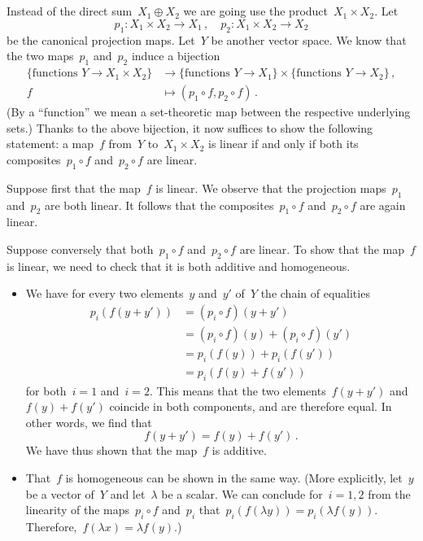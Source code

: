 \subsection{}

Instead of the direct sum~$X_1 ⊕ X_2$ we are going use the product~$X_1 × X_2$.
Let
\[
	p_1 \colon X_1 × X_2 \to X_1 \,,
	\quad
	p_2 \colon X_1 × X_2 \to X_2
\]
be the canonical projection maps.
Let~$Y$ be another vector space.
We know that the two maps~$p_1$ and~$p_2$ induce a bijection
\begin{align*}
	\{ \text{functions~$\textstyle Y \to X_1 × X_2$} \}
	&\to
	\{ \text{functions~$\textstyle Y \to X_1$} \}
	×
	\{ \text{functions~$\textstyle Y \to X_2$} \} \,,
	\\
	f
	&\mapsto
	(p_1 ∘ f, p_2 ∘ f) \,.
\end{align*}
(By a \enquote{function} we mean a set-theoretic map between the respective underlying sets.)
Thanks to the above bijection, it now suffices to show the following statement:
a map~$f$ from~$Y$ to~$X_1 × X_2$ is linear if and only if both its composites~$p_1 ∘ f$ and~$p_2 ∘ f$ are linear.

Suppose first that the map~$f$ is linear.
We observe that the projection maps~$p_1$ and~$p_2$ are both linear.
It follows that the composites~$p_1 ∘ f$ and~$p_2 ∘ f$ are again linear.

Suppose conversely that both~$p_1 ∘ f$ and~$p_2 ∘ f$ are linear.
To show that the map~$f$ is linear, we need to check that it is both additive and homogeneous.
\begin{itemize}

	\item
		We have for every two elements~$y$ and~$y'$ of~$Y$ the chain of equalities
		\begin{align*}
			p_i(f(y + y'))
			&=
			(p_i ∘ f)(y + y')
			\\
			&=
			(p_i ∘ f)(y) + (p_i ∘ f)(y')
			\\
			&=
			p_i(f(y)) + p_i(f(y'))
			\\
			&=
			p_i( f(y) + f(y') )
		\end{align*}
		for both~$i = 1$ and~$i = 2$.
		This means that the two elements~$f(y + y')$ and~$f(y) + f(y')$ coincide in both components, and are therefore equal.
		In other words, we find that
		\[
			f(y + y') = f(y) + f(y') \,.
		\]
		We have thus shown that the map~$f$ is additive.

	\item
		That~$f$ is homogeneous can be shown in the same way.
		(More explicitly, let~$y$ be a vector of~$Y$ and let~$λ$ be a scalar.
		We can conclude for~$i = 1, 2$ from the linearity of the maps~$p_i ∘ f$ and~$p_i$ that~$p_i(f(λ y)) = p_i(λ f(y))$.
		Therefore,~$f(λ x) = λ f(y)$.)

\end{itemize}
